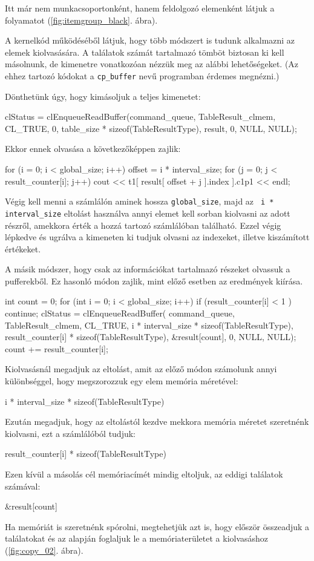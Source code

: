Itt már nem munkacsoportonként, hanem feldolgozó elemenként látjuk a folyamatot (\ref{fig:itemgroup_black}. ábra).


A kernelkód működéséből látjuk, hogy több módszert is tudunk alkalmazni az elemek kiolvasására. A találatok számát tartalmazó tömböt biztosan ki kell másolnunk, de kimenetre vonatkozóan nézzük meg az alábbi lehetőségeket. (Az ehhez tartozó kódokat a \texttt{cp\_buffer} nevű programban érdemes megnézni.)


Dönthetünk úgy, hogy kimásoljuk a teljes kimenetet:
\begin{python}
clStatus = clEnqueueReadBuffer(command_queue, TableResult_clmem, 
    CL_TRUE, 0, table_size * sizeof(TableResultType), result, 
    0, NULL, NULL);
\end{python}
Ekkor ennek olvasása a következőképpen zajlik:
\begin{python}
for (i = 0; i < global_size; i++)
{
    offset = i * interval_size;
    for (j = 0; j < result_counter[i]; j++)
        cout << t1[ result[ offset + j ].index ].c1p1 << endl;
}
\end{python}
Végig kell menni a számlálón aminek hossza \texttt{global\_size}, majd az \texttt{ i * interval\_size} eltolást használva annyi elemet kell sorban kiolvasni az adott részről, amekkora érték a hozzá tartozó számlálóban található. Ezzel végig lépkedve és ugrálva a kimeneten ki tudjuk olvasni az indexeket, illetve kiszámított értékeket.


A másik módszer, hogy csak az információkat tartalmazó részeket olvassuk a pufferekből. Ez hasonló módon zajlik, mint előző esetben az eredmények kiírása.
\begin{python}
int count = 0;
for (int i = 0; i < global_size; i++)
{
    if (result_counter[i] < 1 ) continue; 
    clStatus = clEnqueueReadBuffer(
    command_queue, TableResult_clmem, CL_TRUE, 
	i * interval_size * sizeof(TableResultType),
	result_counter[i] * sizeof(TableResultType), 
	&result[count], 0, NULL, NULL);
	count += result_counter[i];
}
\end{python}

Kiolvasásnál megadjuk az eltolást, amit az előző módon számolunk annyi különbséggel, hogy megszorozzuk egy elem memória méretével:
\begin{python}
i * interval_size * sizeof(TableResultType)
\end{python}
Ezután megadjuk, hogy az eltolástól kezdve mekkora memória méretet szeretnénk kiolvasni, ezt a számlálóból tudjuk: 
\begin{python}
result_counter[i] * sizeof(TableResultType)
\end{python}
Ezen kívül a másolás cél memóriacímét mindig eltoljuk, az eddigi találatok számával:
\begin{python}
&result[count]
\end{python}
Ha memóriát is szeretnénk spórolni, megtehetjük azt is, hogy először összeadjuk a találatokat és az alapján foglaljuk le a memóriaterületet a kiolvasáshoz (\ref{fig:copy_02}. ábra).

